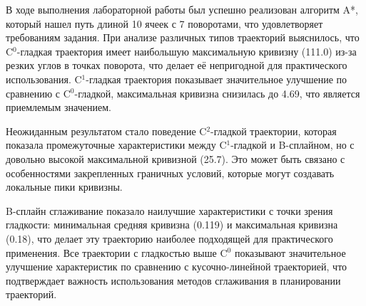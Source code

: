 В ходе выполнения лабораторной работы был успешно реализован алгоритм A*, который нашел путь длиной 10 ячеек с 7 поворотами, что удовлетворяет требованиям задания. При анализе различных типов траекторий выяснилось, что C$^0$-гладкая траектория имеет наибольшую максимальную кривизну (111.0) из-за резких углов в точках поворота, что делает её непригодной для практического использования. C$^1$-гладкая траектория показывает значительное улучшение по сравнению с C$^0$-гладкой, максимальная кривизна снизилась до 4.69, что является приемлемым значением. 

Неожиданным результатом стало поведение C$^2$-гладкой траектории, которая показала промежуточные характеристики между C$^1$-гладкой и B-сплайном, но с довольно высокой максимальной кривизной (25.7). Это может быть связано с особенностями закрепленных граничных условий, которые могут создавать локальные пики кривизны.

B-сплайн сглаживание показало наилучшие характеристики с точки зрения гладкости: минимальная средняя кривизна (0.119) и максимальная кривизна (0.18), что делает эту траекторию наиболее подходящей для практического применения. Все траектории с гладкостью выше C$^0$ показывают значительное улучшение характеристик по сравнению с кусочно-линейной траекторией, что подтверждает важность использования методов сглаживания в планировании траекторий.


